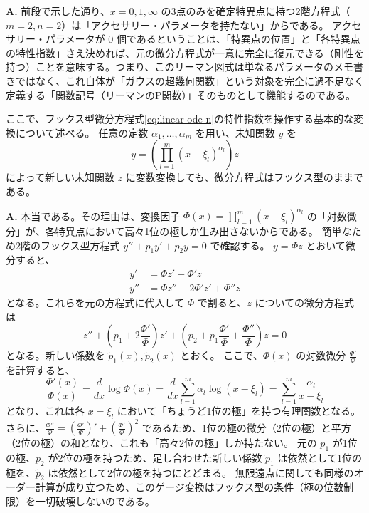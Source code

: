\begin{Q}
\textbf{A.} 前段で示した通り、$x=0, 1, \infty$ の3点のみを確定特異点に持つ2階方程式（$m=2, n=2$）は「アクセサリー・パラメータを持たない」からである。
アクセサリー・パラメータが $0$ 個であるということは、「特異点の位置」と「各特異点の特性指数」さえ決めれば、元の微分方程式が一意に完全に復元できる（剛性を持つ）ことを意味する。つまり、このリーマン図式は単なるパラメータのメモ書きではなく、これ自体が「ガウスの超幾何関数」という対象を完全に過不足なく定義する「関数記号（リーマンのP関数）」そのものとして機能するのである。
\end{Q}
ここで、フックス型微分方程式\eqref{eq:linear-ode-n}の特性指数を操作する基本的な変換について述べる。
任意の定数 $\alpha_{1}, \dots, \alpha_{m}$ を用い、未知関数 $y$ を
\begin{equation}\label{eq:gauge_transform}
y = \left( \prod_{l=1}^{m} (x-\xi_{l})^{\alpha_{l}} \right) z
\end{equation}
によって新しい未知関数 $z$ に変数変換しても、微分方程式はフックス型のままである。
\begin{Q}[【核心】$y = \left( \prod_{l=1}^{m} (x-\xi_{l})^{\alpha_{l}} \right) z$ という変換を行っても、微分方程式が「フックス型（確定特異点のみを持つ）」であるという性質は本当に壊れないのか？]
\textbf{A.} 本当である。その理由は、変換因子 $\Phi(x) = \prod_{l=1}^{m} (x-\xi_{l})^{\alpha_{l}}$ の「対数微分」が、各特異点において高々1位の極しか生み出さないからである。
簡単なため2階のフックス型方程式 $y'' + p_{1}y' + p_{2}y = 0$ で確認する。
$y = \Phi z$ とおいて微分すると、
\begin{align*}
y' &= \Phi z' + \Phi' z \\
y'' &= \Phi z'' + 2\Phi' z' + \Phi'' z
\end{align*}
となる。これらを元の方程式に代入して $\Phi$ で割ると、$z$ についての微分方程式は
\[
z'' + \left( p_{1} + 2\frac{\Phi'}{\Phi} \right) z' + \left( p_{2} + p_{1}\frac{\Phi'}{\Phi} + \frac{\Phi''}{\Phi} \right) z = 0
\]
となる。新しい係数を $\tilde{p}_{1}(x), \tilde{p}_{2}(x)$ とおく。
ここで、$\Phi(x)$ の対数微分 $\frac{\Phi'}{\Phi}$ を計算すると、
\[
\frac{\Phi'(x)}{\Phi(x)} = \frac{d}{dx} \log \Phi(x) = \frac{d}{dx} \sum_{l=1}^{m} \alpha_{l} \log(x-\xi_{l}) = \sum_{l=1}^{m} \frac{\alpha_{l}}{x-\xi_{l}}
\]
となり、これは各 $x=\xi_{l}$ において「ちょうど1位の極」を持つ有理関数となる。
さらに、$\frac{\Phi''}{\Phi} = \left(\frac{\Phi'}{\Phi}\right)' + \left(\frac{\Phi'}{\Phi}\right)^{2}$ であるため、1位の極の微分（2位の極）と平方（2位の極）の和となり、これも「高々2位の極」しか持たない。
元の $p_{1}$ が1位の極、$p_{2}$ が2位の極を持つため、足し合わせた新しい係数 $\tilde{p}_{1}$ は依然として1位の極を、$\tilde{p}_{2}$ は依然として2位の極を持つにとどまる。
無限遠点に関しても同様のオーダー計算が成り立つため、このゲージ変換はフックス型の条件（極の位数制限）を一切破壊しないのである。
\end{Q}
